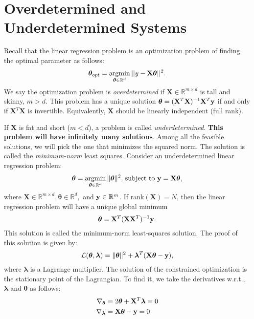 \section{Overdetermined and Underdetermined Systems}
Recall that the linear regression problem is an optimization problem of finding the optimal parameter as follows:
$$\boldsymbol{\theta}_{opt} = \operatorname*{\operatorname{argmin}}_{\boldsymbol{\theta}\in \mathbb{R}^d}||y-\mathbf{X}\boldsymbol{\theta}||^2.$$
We say the optimization problem is \textit{overdetermined} if $\mathbf{X}\in \mathbb{R}^{m\times d}$ is tall and skinny, \ie $m>d$. This problem has a unique solution $\boldsymbol{\theta}	= (\mathbf{X}^T\mathbf{X})^{-1}\mathbf{X}^T{\mathbf{y}}$ if and only if $\mathbf{X}^T\mathbf{X}$ is invertible. Equivalently, $\mathbf{X}$ should be linearly independent (\ie full rank). 

If $\mathbf{X}$ is fat and short (\ie $m<d$), a problem is called \textit{underdetermined}. \textbf{This problem will have infinitely many solutions}. Among all the feasible solutions, we will pick the one that minimizes the squared norm. The solution is called the \textit{minimum-norm} least squares. Consider an underdetermined linear regression problem:  
\begin{align*}
	\boldsymbol{\theta} = \operatorname*{\operatorname{argmin}}_{\boldsymbol{\theta}\in \mathbb{R}^d} \|\boldsymbol{\theta}\|^2, \,\textrm{subject to}\ {\mathbf{y}} = \mathbf{X}\boldsymbol{\theta},
\end{align*}
where $\mathbf{X}\in \mathbb{R}^{m\times d}, \boldsymbol{\theta}\in \mathbb{R}^d,$ and ${\mathbf{y}}\in \mathbb{R}^m$. If rank$(\mathbf{X})=N$, then the linear regression problem will have a unique global minimum 
\begin{align*}
	\boldsymbol{\theta} = \mathbf{X}^T(\mathbf{X}\mathbf{X}^T)^{-1}{\mathbf{y}}.
\end{align*}
This solution is called the minimum-norm least-squares solution. The proof of this solution is given by:
\begin{align*}
	\mathcal{L}(\boldsymbol{\theta}, \boldsymbol{\lambda}) = \|\boldsymbol{\theta}\|^2 + \boldsymbol{\lambda}^T(\mathbf{X}\boldsymbol{\theta}-{\mathbf{y}}),
\end{align*}
where $\boldsymbol{\lambda}$ is a Lagrange multiplier. The solution of the constrained optimization is the stationary point of the Lagrangian. To find it, we take the derivatives w.r.t., $\boldsymbol{\lambda}$ and $\boldsymbol{\theta}$ as follows: 
\begin{align*}
	\nabla_{\boldsymbol{\theta}} &= 2 \boldsymbol{\theta} + \mathbf{X}^T\boldsymbol{\lambda} = 0\\ 
	\nabla_{\boldsymbol{\lambda}} &= \mathbf{X}\boldsymbol{\theta} - {\mathbf{y}} = 0
\end{align*}
